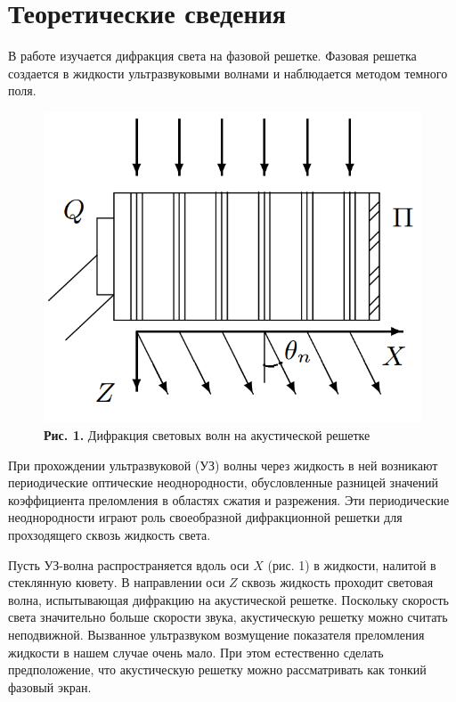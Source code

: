 \documentclass[a4paper,12pt]{article} %
\begin{document}
\section{Теоретические сведения}
\hfill \break В работе изучается дифракция света на фазовой решетке. Фазовая решетка создается в жидкости ультразвуковыми волнами и наблюдается методом темного поля.

\begin{figure}
\begin{center}
    \includegraphics[width=1\textwidth]{4.3.2_1.png}
    \textbf{Рис. 1.} Дифракция световых волн на акустической решетке
\end{center}
\end{figure}

\hfill \break При прохождении ультразвуковой (УЗ) волны через жидкость в ней возникают периодические оптические неоднородности, обусловленные разницей значений коэффициента преломления в областях сжатия и разрежения. Эти периодические неоднородности играют роль своеобразной дифракционной решетки для прохзодящего сквозь жидкость света.

\hfill \break Пусть УЗ-волна распространяется вдоль оси $X$ (рис. 1) в жидкости, налитой в стеклянную кювету. В направлении оси $Z$ сквозь жидкость проходит световая волна, испытывающая дифракцию на акустической решетке. Поскольку скорость света значительно больше скорости звука, акустическую решетку можно считать неподвижной. Вызванное ультразвуком возмущение показателя преломления жидкости в нашем случае очень мало. При этом естественно сделать предположение, что акустическую решетку можно рассматривать как тонкий фазовый экран.
\end{document}
